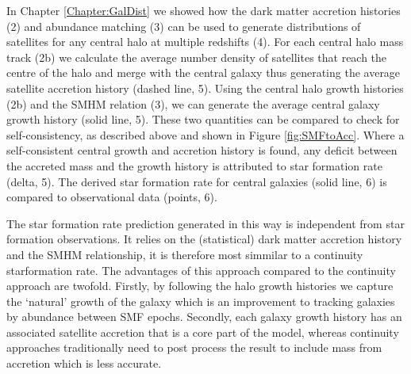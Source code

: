 In Chapter \ref{Chapter:GalDist} we showed how the \textcolor{MPLred}{dark matter accretion histories (2)} and abundance matching (3) can be used to generate \textcolor{MPLblue}{distributions of satellites for any central halo at multiple redshifts (4)}. For each \textcolor{MPLred}{central halo mass track (2b)} we calculate the average number density of satellites that reach the centre of the halo and merge with the central galaxy \textcolor{MPLblue}{thus generating the average satellite accretion history (dashed line, 5)}. \textcolor{MPLred}{Using the central halo growth histories (2b)} and the SMHM relation (3), we can generate the \textcolor{MPLblue}{average central galaxy growth history (solid line, 5)}. These two quantities can be compared to check for self-consistency, as described above and shown in Figure \ref{fig:SMFtoAcc}. Where a self-consistent central growth and accretion history is found, any deficit between the accreted mass and the growth history is attributed to \textcolor{MPLblue}{star formation rate (delta, 5)}. \textcolor{MPLblue}{The derived star formation rate for central galaxies (solid line, 6) is compared to observational data (points, 6)}. 

The star formation rate prediction generated in this way is independent from star formation observations. It relies on the (statistical) dark matter accretion history and the SMHM relationship, it is therefore most simmilar to a continuity starformation rate. The advantages of this approach compared to the continuity approach are twofold. Firstly, by following the halo growth histories we capture the `natural' growth of the galaxy which is an improvement to tracking galaxies by abundance between SMF epochs. Secondly, each galaxy growth history has an associated satellite accretion that is a core part of the model, whereas continuity approaches traditionally need to post process the result to include mass from accretion which is less accurate.

